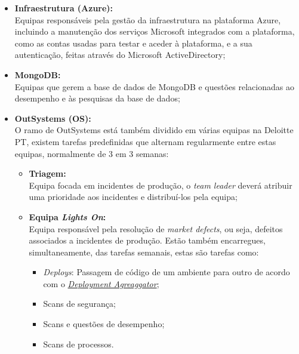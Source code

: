                 \begin{itemize}
                    \item \textbf{Infraestrutura (Azure):} \\
                    Equipas responsáveis pela gestão da infraestrutura na plataforma Azure, incluindo a manutenção dos serviços Microsoft integrados com a plataforma, como as contas usadas para testar e aceder à plataforma, e a sua autenticação, feitas através do Microsoft ActiveDirectory;
                    \item \textbf{MongoDB:} \\
                    Equipas que gerem a base de dados de MongoDB e questões relacionadas ao desempenho e às pesquisas da base de dados;
                    \item \textbf{OutSystems (OS):} \\
                    O ramo de OutSystems está também dividido em várias equipas na Deloitte PT, existem tarefas predefinidas que alternam regularmente entre estas equipas, normalmente de 3 em 3 semanas:
                    
                    \begin{itemize}
                        \item \textbf{Triagem:} \\
                        Equipa focada em incidentes de produção, o \textit{team leader} deverá atribuir uma prioridade aos incidentes e distribuí-los pela equipa;
                        
                        \item \textbf{Equipa \textit{Lights On}:} \\
                        Equipa responsável pela resolução de \textit{market defects}, ou seja, defeitos associados a incidentes de produção. Estão também encarregues, simultaneamente, das tarefas semanais, estas são tarefas como:
                        \begin{itemize}
                            \item \textit{Deploys}: Passagem de código de um ambiente para outro de acordo com o \hyperref[fig:deployment-aggregator]{\textit{Deployment Agreaggator}};
                            \item Scans de segurança;
                            \item Scans e questões de desempenho;
                            \item Scans de processos.
                        \end{itemize}
                        

\end{itemize}
\end{itemize}
